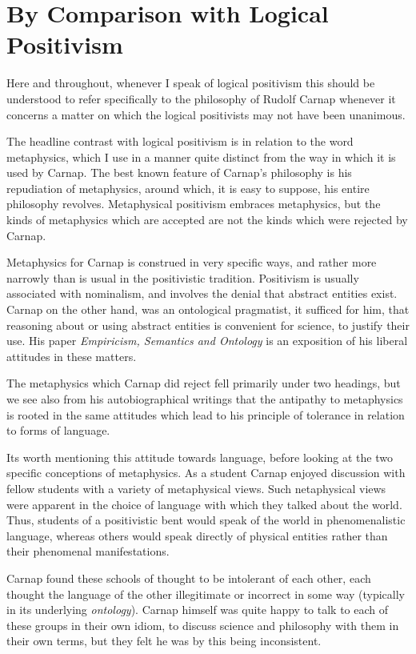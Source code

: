 \section{By Comparison with Logical Positivism}

Here and throughout, whenever I speak of logical positivism this should
be understood to refer specifically to the philosophy of Rudolf Carnap
whenever it concerns a matter on which the logical positivists may not
have been unanimous.

The headline contrast with logical positivism is in relation to the
word metaphysics, which I use in a manner quite distinct from the way
in which it is used by Carnap.
The best known feature of Carnap's philosophy is his repudiation of
metaphysics, around which, it is easy to suppose, his entire philosophy
revolves.
Metaphysical positivism embraces metaphysics, but the kinds of
metaphysics which are accepted are not the kinds which were rejected
by Carnap.

Metaphysics for Carnap is construed in very specific ways, and rather
more narrowly than is usual in the positivistic tradition.
Positivism is usually associated with nominalism, and involves the
denial that abstract entities exist.
Carnap on the other hand, was an ontological pragmatist, it sufficed
for him, that reasoning about or using abstract entities is convenient for science, to
justify their use.
His paper \emph{Empiricism, Semantics and Ontology} is an exposition
of his liberal attitudes in these matters.

The metaphysics which Carnap did reject fell primarily under two
headings, but we see also from his autobiographical writings that the
antipathy to metaphysics is rooted in the same attitudes which lead to
his principle of tolerance in relation to forms of language.

Its worth mentioning this attitude towards language, before looking at
the two specific conceptions of metaphysics.
As a student Carnap enjoyed discussion with fellow students with a
variety of metaphysical views.
Such netaphysical views were apparent in the choice of language with
which they talked about the world.
Thus, students of a positivistic bent would speak of the world in
phenomenalistic language, whereas others would speak directly of
physical entities rather than their phenomenal manifestations.

Carnap found these schools of thought to be intolerant of each other,
each thought the language of the other illegitimate or incorrect in
some way (typically in its underlying {\it ontology}).
Carnap himself was quite happy to talk to each of these groups in
their own idiom, to discuss science and philosophy with them in their
own terms, but they felt he was by this being inconsistent.

